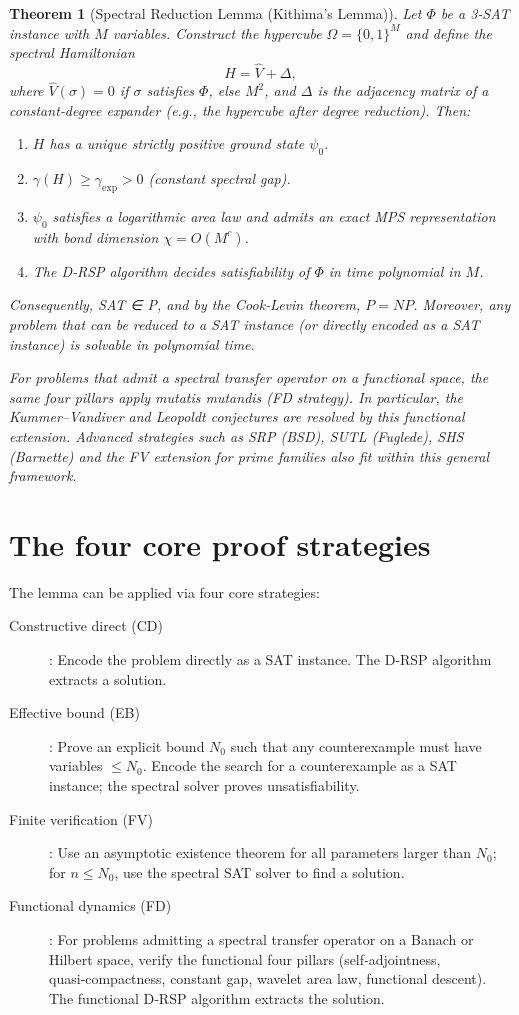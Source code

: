 \documentclass[11pt,a4paper]{article}
\newtheorem{theorem}{Theorem}[section]
\begin{document}
\begin{theorem}[Spectral Reduction Lemma (Kithima's Lemma)]
Let \(\Phi\) be a 3‑SAT instance with \(M\) variables. Construct the hypercube \(\Omega = \{0,1\}^M\) and define the spectral Hamiltonian
\[
H = \hat{V} + \Delta,
\]
where \(\hat{V}(\sigma)=0\) if \(\sigma\) satisfies \(\Phi\), else \(M^2\), and \(\Delta\) is the adjacency matrix of a constant‑degree expander (e.g., the hypercube after degree reduction). Then:
\begin{enumerate}
\item \(H\) has a unique strictly positive ground state \(\psi_0\).
\item \(\gamma(H) \ge \gamma_{\mathrm{exp}} > 0\) (constant spectral gap).
\item \(\psi_0\) satisfies a logarithmic area law and admits an exact MPS representation with bond dimension \(\chi = O(M^c)\).
\item The D‑RSP algorithm decides satisfiability of \(\Phi\) in time polynomial in \(M\).
\end{enumerate}
Consequently, SAT ∈ P, and by the Cook‑Levin theorem, \(P = NP\). Moreover, any problem that can be reduced to a SAT instance (or directly encoded as a SAT instance) is solvable in polynomial time.

For problems that admit a spectral transfer operator on a functional space, the same four pillars apply mutatis mutandis (FD strategy). In particular, the Kummer–Vandiver and Leopoldt conjectures are resolved by this functional extension. Advanced strategies such as SRP (BSD), SUTL (Fuglede), SHS (Barnette) and the FV extension for prime families also fit within this general framework.
\end{theorem}

\section{The four core proof strategies}

The lemma can be applied via four core strategies:

\begin{description}
\item[Constructive direct (CD)]: Encode the problem directly as a SAT instance. The D‑RSP algorithm extracts a solution.
\item[Effective bound (EB)]: Prove an explicit bound \(N_0\) such that any counterexample must have variables \(\le N_0\). Encode the search for a counterexample as a SAT instance; the spectral solver proves unsatisfiability.
\item[Finite verification (FV)]: Use an asymptotic existence theorem for all parameters larger than \(N_0\); for \(n\le N_0\), use the spectral SAT solver to find a solution.
\item[Functional dynamics (FD)]: For problems admitting a spectral transfer operator on a Banach or Hilbert space, verify the functional four pillars (self‑adjointness, quasi‑compactness, constant gap, wavelet area law, functional descent). The functional D‑RSP algorithm extracts the solution.
\end{description}
\end{document}
